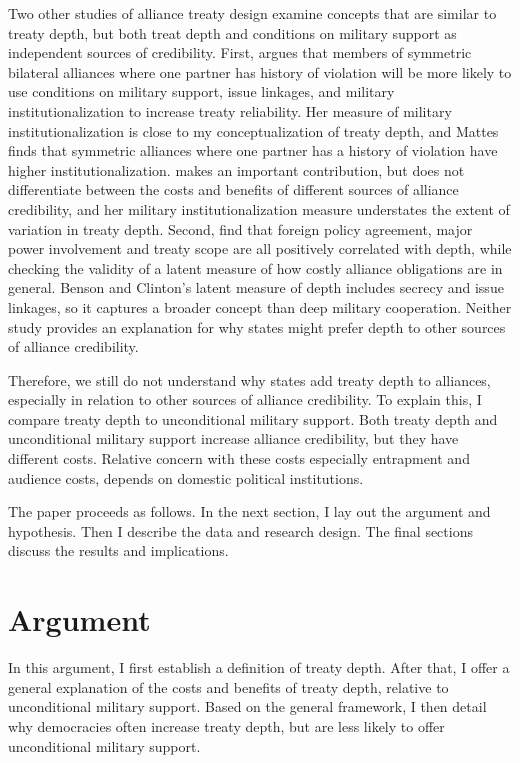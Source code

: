 \documentclass[12pt]{article}
\begin{document}
Two other studies of alliance treaty design examine concepts that are similar to treaty depth, but both treat depth and conditions on military support as independent sources of credibility.   
First, \citet{Mattes2012} argues that members of symmetric bilateral alliances where one partner has history of violation will be more likely to use conditions on military support, issue linkages, and military institutionalization to increase treaty reliability. 
Her measure of military institutionalization \citep{LeedsAnac2005} is close to my conceptualization of treaty depth, and Mattes finds that symmetric alliances where one partner has a history of violation have higher institutionalization.
\citet{Mattes2012} makes an important contribution, but does not differentiate between the costs and benefits of different sources of alliance credibility, and her military institutionalization measure understates the extent of variation in treaty depth.  
Second, \citet{BensonClinton2016} find that foreign policy agreement, major power involvement and treaty scope are all positively correlated with depth, while checking the validity of a latent measure of how costly alliance obligations are in general. 
Benson and Clinton's latent measure of depth includes secrecy and issue linkages, so it captures a broader concept than deep military cooperation. 
Neither study provides an explanation for why states might prefer depth to other sources of alliance credibility. 


Therefore, we still do not understand why states add treaty depth to alliances, especially in relation to other sources of alliance credibility. 
To explain this, I compare treaty depth to unconditional military support.  
Both treaty depth and unconditional military support increase alliance credibility, but they have different costs.
Relative concern with these costs especially entrapment and audience costs, depends on domestic political institutions. 


The paper proceeds as follows. 
In the next section, I lay out the argument and hypothesis. 
Then I describe the data and research design. 
The final sections discuss the results and implications. 


\section{Argument}


In this argument, I first establish a definition of treaty depth.  
After that, I offer a general explanation of the costs and benefits of treaty depth, relative to unconditional military support. 
Based on the general framework, I then detail why democracies often increase treaty depth, but are less likely to offer unconditional military support. 
\end{document}
